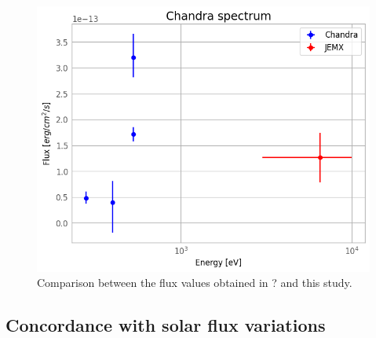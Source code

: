     \begin{figure}[H]
        \centering
        \includegraphics[width = 12cm]{report/Figures/results/spectra_comp.png}
        \caption{Comparison between the flux values obtained in ? and this study.}
        \label{comp_spec}
    \end{figure}
    
    \subsection{Concordance with solar flux variations}

